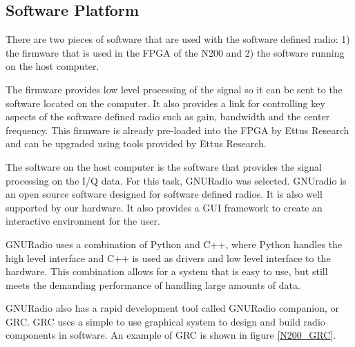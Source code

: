 
\subsection{Software Platform} \label{software_platform}

There are two pieces of software that are used with the software defined radio:  1) the firmware that is used in the FPGA of the N200 and 2) the software running on the host computer.  

The firmware provides low level processing of the signal so it can be sent to the software located on the computer.  It also provides a link for controlling key aspects of the software defined radio such as gain, bandwidth and the center frequency.  This firmware is already pre-loaded into the FPGA by Ettus Research and can be upgraded using tools provided by Ettus Research.

The software on the host computer is the software that provides the signal processing on the I/Q data.  For this task, GNURadio was selected.   GNUradio is an open source software designed for software defined radios.  It is also well supported by our hardware.  It also provides a GUI framework to create an interactive environment for the user.   

GNURadio uses a combination of Python and C++, where Python handles the high level interface and C++ is used as drivers and low level interface to the hardware.  This combination allows for a system that is easy to use, but still meets the demanding performance of handling large amounts of data. 

GNURadio also has a rapid development tool called GNURadio companion, or GRC.  GRC uses a simple to use graphical system to design and build radio components in software. An example of GRC is shown in figure \ref{N200_GRC}.

